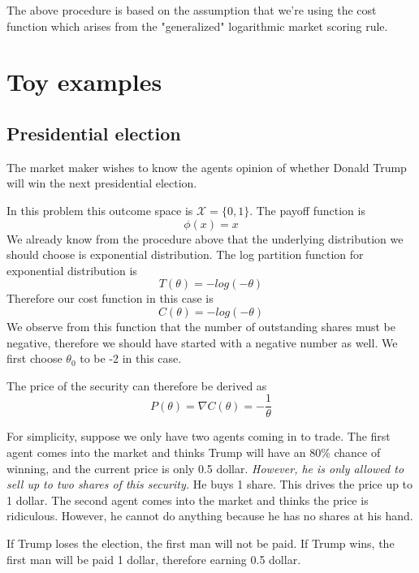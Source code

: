 \documentclass{article}
\begin{document}
The above procedure is based on the assumption that we're using the cost function which arises from the "generalized" logarithmic market scoring rule.
\section{Toy examples}
\subsection{Presidential election}
The market maker wishes to know the agents opinion of whether Donald Trump will win the next presidential election.

In this problem this outcome space is $\mathcal{X}=\{0,1\}$. The payoff function is \begin{displaymath}
\phi(x)=x
\end{displaymath}
We already know from the procedure above that the underlying distribution we should choose is exponential distribution. The log partition function for exponential distribution is
\begin{displaymath}
T(\theta)=-log(-\theta)
\end{displaymath}
Therefore our cost function in this case is
\begin{displaymath}
C(\theta)=-log(-\theta)
\end{displaymath}
We observe from this function that the number of outstanding shares must be negative, therefore we should have started with a negative number as well. We first choose $\theta_0$ to be -2 in this case.

The price of the security can therefore be derived as
\begin{displaymath}
P(\theta)=\nabla C(\theta)=-\frac{1}{\theta}
\end{displaymath}

For simplicity, suppose we only have two agents coming in to trade. The first agent comes into the market and thinks Trump will have an 80\% chance of winning, and the current price is only 0.5 dollar. \emph{However, he is only allowed to sell up to two shares of this security.} He buys 1 share. This drives the price up to 1 dollar. The second agent comes into the market and thinks the price is ridiculous. However, he cannot do anything because he has no shares at his hand. 

If Trump loses the election, the first man will not be paid. If Trump wins, the first man will be paid 1 dollar, therefore earning 0.5 dollar.
\end{document}
